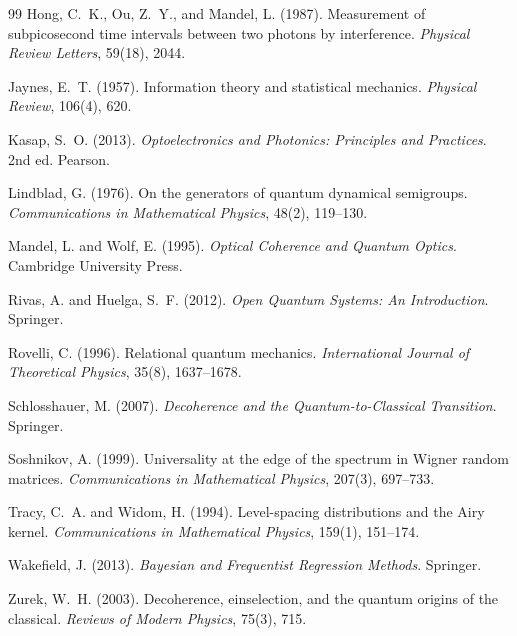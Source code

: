 \documentclass[11pt, openright, twoside]{book}
\theoremstyle{plain}
\theoremstyle{definition}
\theoremstyle{remark}
\begin{document}
\begin{thebibliography}{99}
Hong, C.~K., Ou, Z.~Y., and Mandel, L. (1987).
Measurement of subpicosecond time intervals between two photons by interference.
\textit{Physical Review Letters}, 59(18), 2044.

Jaynes, E.~T. (1957). Information theory and statistical mechanics.
\textit{Physical Review}, 106(4), 620.

Kasap, S.~O. (2013).
\textit{Optoelectronics and Photonics: Principles and Practices}. 2nd ed. Pearson.

Lindblad, G. (1976). On the generators of quantum dynamical semigroups.
\textit{Communications in Mathematical Physics}, 48(2), 119--130.

Mandel, L. and Wolf, E. (1995).
\textit{Optical Coherence and Quantum Optics}. Cambridge University Press.

Rivas, A. and Huelga, S.~F. (2012).
\textit{Open Quantum Systems: An Introduction}. Springer.

Rovelli, C. (1996). Relational quantum mechanics.
\textit{International Journal of Theoretical Physics}, 35(8), 1637--1678.

Schlosshauer, M. (2007).
\textit{Decoherence and the Quantum-to-Classical Transition}. Springer.

Soshnikov, A. (1999). Universality at the edge of the spectrum in Wigner random matrices.
\textit{Communications in Mathematical Physics}, 207(3), 697--733.

Tracy, C.~A. and Widom, H. (1994). Level-spacing distributions and the Airy kernel.
\textit{Communications in Mathematical Physics}, 159(1), 151--174.

Wakefield, J. (2013).
\textit{Bayesian and Frequentist Regression Methods}. Springer.

Zurek, W.~H. (2003). Decoherence, einselection, and the quantum origins of the classical.
\textit{Reviews of Modern Physics}, 75(3), 715.

\end{thebibliography}

\printindex
\end{document}

